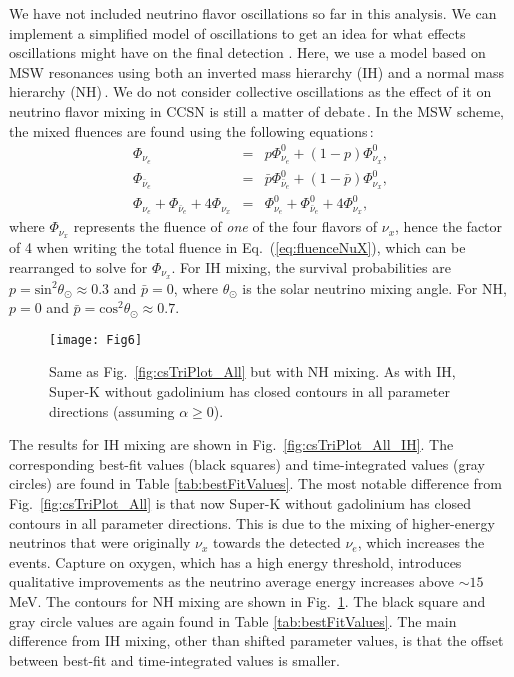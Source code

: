 \documentclass[aps,reprint,superscriptaddress]{revtex4-1}
\begin{document}
We have not included neutrino flavor oscillations so far in this analysis. We can implement a simplified model of oscillations to get an idea for what effects oscillations might have on the final detection \cite{GilBotella:2003sz}. Here, we use a model based on MSW resonances using both an inverted mass hierarchy (IH) and a normal mass hierarchy (NH)\,\cite{Dighe:2007ks}.  We do not consider collective oscillations as the effect of it on neutrino flavor mixing in  CCSN  is still a matter of debate\,\cite{Chakraborty:2015tfa,Dasgupta:2016dbv,Capozzi:2016oyk,Dasgupta:2015iia,Cherry:2012zw,Duan:2010bf}.  In the MSW scheme, the mixed fluences are found using the following equations\,\cite{Dighe:2007ks}:
\begin{eqnarray}
\Phi_{\nu_e}&=&p\Phi_{\nu_e}^0+(1-p)\Phi_{\nu_x}^0, \\
\Phi_{\bar{\nu}_{e}}&=&\bar{p}\Phi_{\bar{\nu}_{e}}^0+(1-\bar{p})\Phi_{\nu_x}^0, \\
\Phi_{\nu_e}+\Phi_{\bar{\nu}_{e}}+4\Phi_{\nu_{x}}&=&\Phi_{\nu_e}^0+\Phi_{\bar{\nu}_{e}}^0+4\Phi_{\nu_x}^0,  \label{eq:fluenceNuX}
\end{eqnarray}
where $\Phi_{\nu_x}$ represents the fluence of \textit{one} of the four flavors of $\nu_x$, hence the factor of 4 when writing the total fluence in Eq.~(\ref{eq:fluenceNuX}), which can be rearranged to solve for $\Phi_{\nu_x}$. For IH mixing, the survival probabilities are $p=\text{sin}^2\theta_\odot \approx0.3$ and $\bar{p}=0$, where $\theta_\odot$ is the solar neutrino mixing angle. For NH, $p=0$ and $\bar{p}=\text{cos}^2\theta_\odot \approx 0.7$.

\begin{figure}[t]
\centering
\texttt{[image: Fig6]}
\caption{Same as Fig.~\ref{fig:csTriPlot_All} but with NH mixing. As with IH, Super-K without gadolinium has closed contours in all parameter directions (assuming $\alpha\geq0$).}
\label{fig:csTriPlot_All_NH}
\end{figure}

The results for IH mixing are shown in Fig.~\ref{fig:csTriPlot_All_IH}. The corresponding best-fit values (black squares) and time-integrated values (gray circles) are found in Table \ref{tab:bestFitValues}. The most notable difference from Fig.~\ref{fig:csTriPlot_All} is that now Super-K without gadolinium has closed contours in all parameter directions.  This is due to the mixing of higher-energy neutrinos that were originally $\nu_x$ towards the detected $\nu_e$, which increases the events.  Capture on oxygen, which has a high energy threshold, introduces qualitative improvements as the neutrino average energy increases above $\sim 15$ MeV.  The contours for NH mixing are shown in Fig.~\ref{fig:csTriPlot_All_NH}. The black square and gray circle values are again found in Table \ref{tab:bestFitValues}. The main difference from IH mixing, other than shifted parameter values, is that the offset between best-fit and time-integrated values is smaller.
\end{document}
